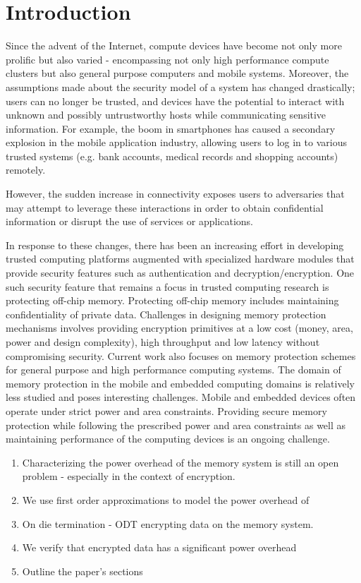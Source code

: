 \section{Introduction}
\label{sec-introduction}

Since the advent of the Internet, compute devices have become not only more
prolific but also varied - encompassing not only high performance compute
clusters but also general purpose computers and mobile systems.  Moreover, the
assumptions made about the security model of a system has changed drastically;
users can no longer be trusted, and devices have the potential to interact with
unknown and possibly untrustworthy hosts while communicating sensitive
information. For example, the boom in smartphones has caused a secondary
explosion in the mobile application industry, allowing users to log in to
various trusted systems (e.g. bank accounts, medical records and shopping
accounts) remotely.

However, the sudden increase in connectivity exposes users to adversaries that
may attempt to leverage these interactions in order to obtain confidential
information or disrupt the use of services or applications.

In response to these changes, there has been an increasing effort in developing
trusted computing platforms augmented with specialized hardware modules that
provide security features such as authentication and decryption/encryption. One
such security feature that remains a focus in trusted computing research is
protecting off-chip memory. Protecting off-chip memory includes maintaining
confidentiality of private data. Challenges in designing memory protection
mechanisms involves providing encryption primitives at a low cost (money, area,
power and design complexity), high throughput and low latency without
compromising security. Current work also focuses on memory protection schemes
for general purpose and high performance computing systems.  The domain of
memory protection in the mobile and embedded computing domains is relatively
less studied and poses interesting challenges.  Mobile and embedded devices
often operate under strict power and area constraints. Providing secure memory
protection while following the prescribed power and area constraints as well as
maintaining performance of the computing devices is an ongoing challenge.

\begin{enumerate}
  \item Characterizing the power overhead of the memory system is still an open
    problem - especially in the context of encryption.
  \item We use first order approximations to model the power overhead of
  \item On die termination - ODT
    encrypting data on the memory system.
  \item We verify that encrypted data has a significant power overhead 
  \item Outline the paper's sections
\end{enumerate}

